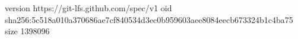 version https://git-lfs.github.com/spec/v1
oid sha256:5c518a010a370686ae7cf840534d3ec0b959603aee8084eecb673324b1c4ba75
size 1398096
